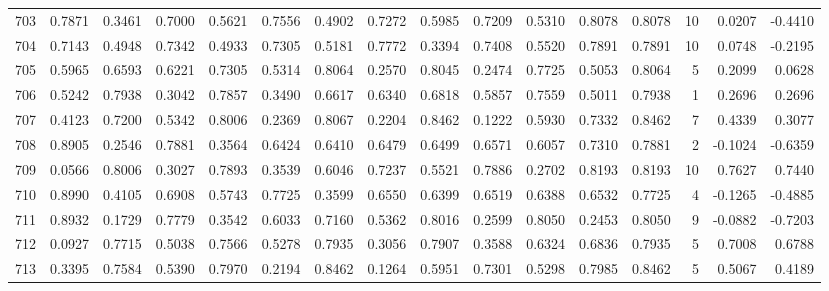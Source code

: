 \begin{tabular}{lrrrrrrrrrrrrrrr}
703 &      0.7871 &  0.3461 &  0.7000 &  0.5621 &  0.7556 &  0.4902 &  0.7272 &  0.5985 &  0.7209 &  0.5310 &   0.8078 &     0.8078 &     10 &                    0.0207 &                    -0.4410 \\
704 &      0.7143 &  0.4948 &  0.7342 &  0.4933 &  0.7305 &  0.5181 &  0.7772 &  0.3394 &  0.7408 &  0.5520 &   0.7891 &     0.7891 &     10 &                    0.0748 &                    -0.2195 \\
705 &      0.5965 &  0.6593 &  0.6221 &  0.7305 &  0.5314 &  0.8064 &  0.2570 &  0.8045 &  0.2474 &  0.7725 &   0.5053 &     0.8064 &      5 &                    0.2099 &                     0.0628 \\
706 &      0.5242 &  0.7938 &  0.3042 &  0.7857 &  0.3490 &  0.6617 &  0.6340 &  0.6818 &  0.5857 &  0.7559 &   0.5011 &     0.7938 &      1 &                    0.2696 &                     0.2696 \\
707 &      0.4123 &  0.7200 &  0.5342 &  0.8006 &  0.2369 &  0.8067 &  0.2204 &  0.8462 &  0.1222 &  0.5930 &   0.7332 &     0.8462 &      7 &                    0.4339 &                     0.3077 \\
708 &      0.8905 &  0.2546 &  0.7881 &  0.3564 &  0.6424 &  0.6410 &  0.6479 &  0.6499 &  0.6571 &  0.6057 &   0.7310 &     0.7881 &      2 &                   -0.1024 &                    -0.6359 \\
709 &      0.0566 &  0.8006 &  0.3027 &  0.7893 &  0.3539 &  0.6046 &  0.7237 &  0.5521 &  0.7886 &  0.2702 &   0.8193 &     0.8193 &     10 &                    0.7627 &                     0.7440 \\
710 &      0.8990 &  0.4105 &  0.6908 &  0.5743 &  0.7725 &  0.3599 &  0.6550 &  0.6399 &  0.6519 &  0.6388 &   0.6532 &     0.7725 &      4 &                   -0.1265 &                    -0.4885 \\
711 &      0.8932 &  0.1729 &  0.7779 &  0.3542 &  0.6033 &  0.7160 &  0.5362 &  0.8016 &  0.2599 &  0.8050 &   0.2453 &     0.8050 &      9 &                   -0.0882 &                    -0.7203 \\
712 &      0.0927 &  0.7715 &  0.5038 &  0.7566 &  0.5278 &  0.7935 &  0.3056 &  0.7907 &  0.3588 &  0.6324 &   0.6836 &     0.7935 &      5 &                    0.7008 &                     0.6788 \\
713 &      0.3395 &  0.7584 &  0.5390 &  0.7970 &  0.2194 &  0.8462 &  0.1264 &  0.5951 &  0.7301 &  0.5298 &   0.7985 &     0.8462 &      5 &                    0.5067 &                     0.4189 \\

\end{tabular}
